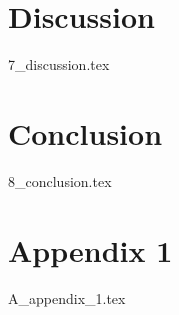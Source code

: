 \documentclass{article} %
\begin{document}
\hypertarget{discussion}{%
\section{Discussion}\label{discussion}}
{7_discussion.tex}


\hypertarget{conclusion}{%
\section{Conclusion}\label{conclusion}}
{8_conclusion.tex}


\newpage





\newpage
\appendix %

\hypertarget{appendix1}{%
\section{Appendix 1}\label{appendix1}}
{A_appendix_1.tex}
\end{document}
